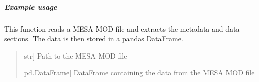 \documentclass[letterpaper,10pt,english]{sphinxmanual}
\begin{document}
\subparagraph{Example usage}
\label{\detokenize{CoolDwarf.model.mesa:example-usage}}
\begin{sphinxVerbatim}[commandchars=\\\{\}]
   
  
\end{sphinxVerbatim}

\begin{fulllineitems}
\label{\detokenize{CoolDwarf.model.mesa:CoolDwarf.model.mesa.mesa.parse_mesa_MOD_file}}
\pysigstartsignatures
{}
\pysigstopsignatures
\sphinxAtStartPar
This function reads a MESA MOD file and extracts the metadata and data sections. The data is then stored in a pandas DataFrame.
\begin{quote}\begin{description}
\begin{description}
\sphinxlineitem{\sphinxstylestrong{filepath}}{[}str{]}
\sphinxAtStartPar
Path to the MESA MOD file

\end{description}

\begin{description}
\sphinxlineitem{\sphinxstylestrong{df}}{[}pd.DataFrame{]}
\sphinxAtStartPar
DataFrame containing the data from the MESA MOD file

\end{description}

\end{description}\end{quote}

\end{fulllineitems}
\end{document}
